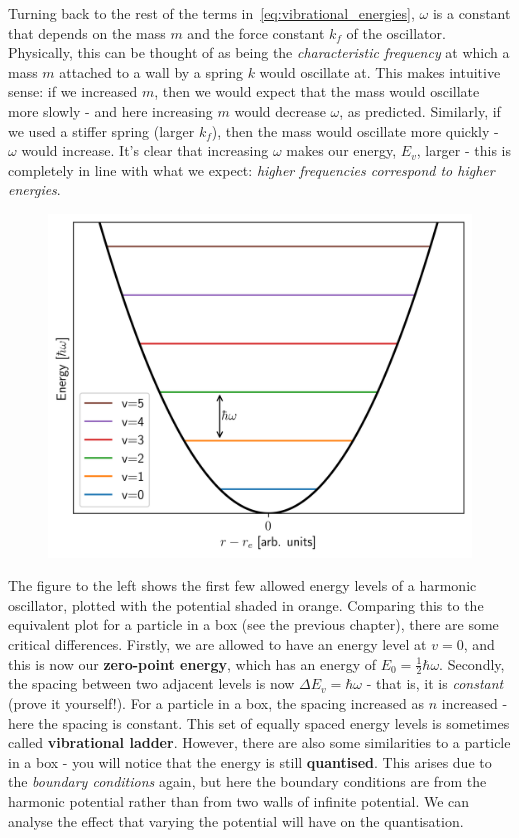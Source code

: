 \documentclass{memoir}[11pt,oneside,a4paper,openany]
\begin{document}
Turning back to the rest of the terms in~\autoref{eq:vibrational_energies}, $\omega$ is a constant that depends on the mass $m$ and the force constant $k_f$ of the oscillator. Physically, this can be thought of as being the \emph{characteristic frequency} at which a mass $m$ attached to a wall by a spring $k$ would oscillate at. This makes intuitive sense: if we increased $m$, then we would expect that the mass would oscillate more slowly - and here increasing $m$ would decrease $\omega$, as predicted. Similarly, if we used a stiffer spring (larger $k_f$), then the mass would oscillate more quickly - $\omega$ would increase. It's clear that increasing $\omega$ makes our energy, $E_v$, larger - this is completely in line with what we expect: \emph{higher frequencies correspond to higher energies}.  

\begin{figure}
	\centering
	\includegraphics[width=\linewidth]{harmonic_oscillator_energies}
\end{figure}
The figure to the left shows the first few allowed energy levels of a harmonic oscillator, plotted with the potential shaded in orange. Comparing this to the equivalent plot for a particle in a box (see the previous chapter), there are some critical differences. Firstly, we are allowed to have an energy level at $v=0$, and this is now our \textbf{zero-point energy}, which has an energy of $E_0 = \frac{1}{2}\hbar\omega$. Secondly, the spacing between two adjacent levels is now $\Delta E_v = \hbar\omega$ - that is, it is \emph{constant} (prove it yourself!). For a particle in a box, the spacing increased as $n$ increased - here the spacing is constant. This set of equally spaced energy levels is sometimes called \textbf{vibrational ladder}. However, there are also some similarities to a particle in a box - you will notice that the energy is still \textbf{quantised}. This arises due to the \emph{boundary conditions} again, but here the boundary conditions are from the harmonic potential rather than from two walls of infinite potential. We can analyse the effect that varying the potential will have on the quantisation.
\end{document}
